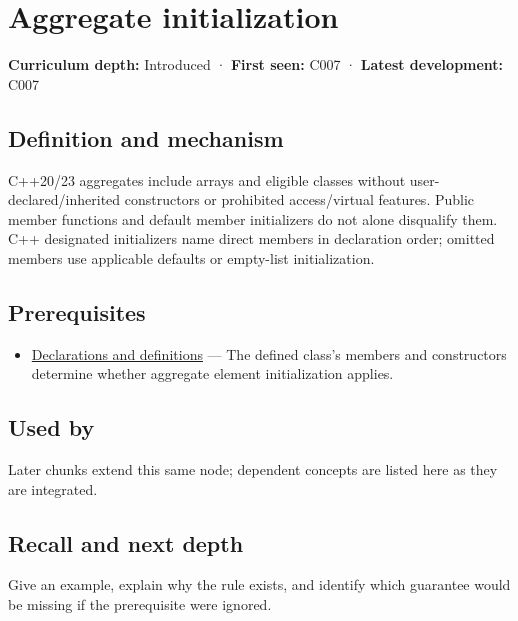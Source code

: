 \hypertarget{appendix-b7174c179542}{}\label{referencestart:appendix-b7174c179542}
\section{Aggregate initialization}\label{appendix-b7174c179542-aggregate-initialization}

\textbf{Curriculum depth:} Introduced · \textbf{First seen:} C007 · \textbf{Latest development:} C007

\subsection{Definition and mechanism}\label{appendix-b7174c179542-definition-and-mechanism}

C++20/23 aggregates include arrays and eligible classes without user-declared/inherited constructors or prohibited access/virtual features. Public member functions and default member initializers do not alone disqualify them. C++ designated initializers name direct members in declaration order; omitted members use applicable defaults or empty-list initialization.

\subsection{Prerequisites}\label{appendix-b7174c179542-prerequisites}

\begin{itemize}
\tightlist
\item
  \hyperref[appendix-2e4d494c2d94]{Declarations and definitions} --- The defined class's members and constructors determine whether aggregate element initialization applies.
\end{itemize}

\subsection{Used by}\label{appendix-b7174c179542-used-by}

Later chunks extend this same node; dependent concepts are listed here as they are integrated.

\subsection{Recall and next depth}\label{appendix-b7174c179542-recall-and-next-depth}

Give an example, explain why the rule exists, and identify which guarantee would be missing if the prerequisite were ignored.

